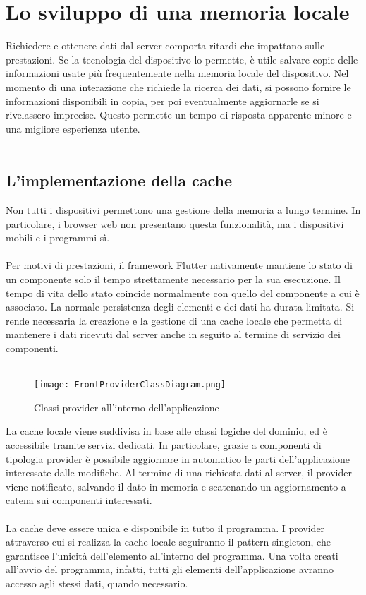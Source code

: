 
\section{Lo sviluppo di una memoria locale}

Richiedere e ottenere dati dal server comporta ritardi che impattano sulle prestazioni. 
Se la tecnologia del dispositivo lo permette, è utile salvare copie delle informazioni usate più frequentemente nella memoria locale del dispositivo. 
Nel momento di una interazione che richiede la ricerca dei dati, si possono fornire le informazioni disponibili in copia, 
per poi eventualmente aggiornarle se si rivelassero imprecise. Questo permette un tempo di risposta apparente minore e una migliore esperienza utente.\\
\\

\subsection{L'implementazione della cache}
Non tutti i dispositivi permettono una gestione della memoria a lungo termine. 
In particolare, i browser web non presentano questa funzionalità, ma i dispositivi mobili e i programmi sì. \\
\\
Per motivi di prestazioni, il framework Flutter nativamente mantiene lo stato di un componente solo il tempo strettamente necessario per la sua esecuzione. 
Il tempo di vita dello stato coincide normalmente con quello del componente a cui è associato. 
La normale persistenza degli elementi e dei dati ha durata limitata. 
Si rende necessaria la creazione e la gestione di una cache locale che permetta di mantenere i dati ricevuti dal server anche in seguito al termine di servizio dei componenti.\\
\\
\begin{figure}[h!]
    \centering
    \texttt{[image: FrontProviderClassDiagram.png]}
    \caption{Classi provider all'interno dell'applicazione}
\end{figure}	
La cache locale viene suddivisa in base alle classi logiche del dominio, ed è accessibile tramite servizi dedicati. 
In particolare, grazie a componenti di tipologia provider è possibile aggiornare in automatico le parti dell’applicazione interessate dalle modifiche. 
Al termine di una richiesta dati al server, il provider viene notificato, salvando il dato in memoria e scatenando un aggiornamento a catena sui componenti interessati.\\
\\
La cache deve essere unica e disponibile in tutto il programma. 
I provider attraverso cui si realizza la cache locale seguiranno il pattern singleton, che garantisce l’unicità dell’elemento all’interno del programma. 
Una volta creati all’avvio del programma, infatti, tutti gli elementi dell’applicazione avranno accesso agli stessi dati, quando necessario.

